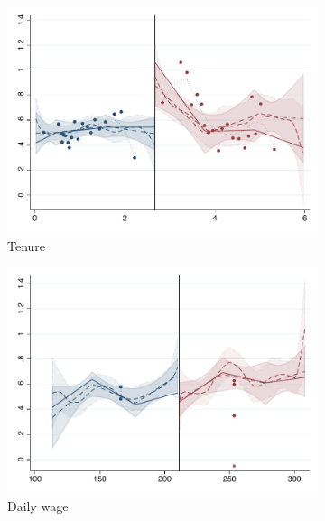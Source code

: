 \documentclass[oneside,11pt]{article}
\begin{document}
\begin{figure}[H]
     \caption{RD plots (Calculator treatment) - Effect on solved conflict}
    \label{rd_t2}
\begin{center}
\begin{subfigure}{0.31\textwidth}

\caption{Tenure}
        \includegraphics[width=\textwidth]{Figuras/rdplot_conflicto_arreglado_tenure_2.pdf}
    \end{subfigure}
    \begin{subfigure}{0.31\textwidth}
\caption{Daily wage}
        \includegraphics[width=\textwidth]{Figuras/rdplot_conflicto_arreglado_dw_2.pdf}
    \end{subfigure}        
    \begin{subfigure}{0.31\textwidth}

\end{subfigure}
\end{center}
\end{figure}
\end{document}

